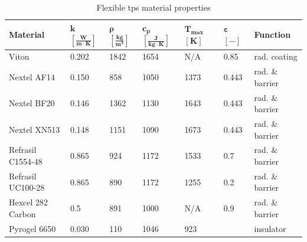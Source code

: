 \begin{table}[ht]
	\caption {Flexible \acrlong{tps} material properties}
	\centering
	\begin{tabular}{|l|l|l|l|l|l|l|}
		\hline
		\textbf{Material}         & \textbf{ $\mathbf{k}$ $\mathbf{\left[\frac{W}{m\cdot K}\right]} $} & \textbf{ $\mathbf{ \rho }$ $\mathbf{ \left[ \frac{kg}{m^3} \right] }$} & \textbf{  $\mathbf{ c_{p} }$ $\mathbf{ \left[ \frac{J}{kg \cdot K} \right] }$ }& \textbf{ $\mathbf{ T_{max} }$ $\mathbf{ [ K ] }$} &\textbf{ $\mathbf{ \varepsilon }$ $\mathbf{ [ - ] }$} & \textbf{Function} \\[1.6ex]   \hline \hline
		Viton       & 0.202 & 1842 & 1654 & N/A	 & 0.85 & rad. coating
		\\ \hline
		Nextel AF14       & 0.150                                                 & 858                                        & 1050                                            & 1373	 & 0.443    & rad. \& barrier                                 \\ \hline
		Nextel BF20       & 0.146 
		& 1362                                        & 1130 
		& 1643	 & 0.443  & rad. \& barrier                                  
		\\ \hline
		Nextel XN513      & 0.148                                                 & 1151                                       & 1090                                            & 1673	 & 0.443           & rad. \& barrier                               \\ \hline
		Refrasil C1554-48 & 0.865                                                 & 924                                        & 1172                                            & 1533	 & 0.7     & rad. \& barrier                                       \\ \hline
		Refrasil UC100-28 & 0.865                                                 & 890                                        & 1172                                            & 1255  & 0.2       & rad. \& barrier                                    \\ \hline
		Hexcel 282 Carbon & 0.5                                                   & 891                                        & 1000                                            & N/A 	 & 0.9      & rad. \& barrier \\ \hline
		Pyrogel 6650      & 0.030                                                 & 110                                        & 1046                                            & 923    & ~        & insulator                                  \\ \hline

\end{tabular}
\end{table}
